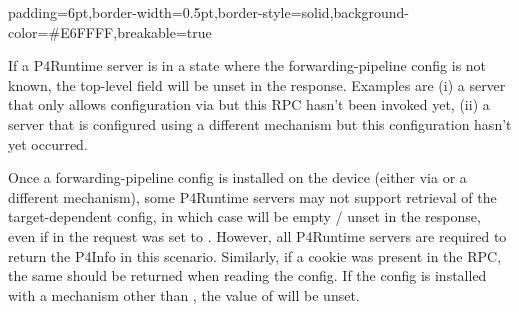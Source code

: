 \documentclass[11pt]{article}
\begin{document}
{%
\begin{mdbmargintb}{6pt}{6pt}%
\begin{mdblock}{padding=6pt,border-width=0.5pt,border-style=solid,background-color=\#E6FFFF,breakable=true}%
\begin{mdpre}%
\end{mdpre}%
\end{mdblock}%
\end{mdbmargintb}%

\noindent{}If a P4Runtime server is in a state where the forwarding-pipeline config is not
known, the top-level  field will be unset in the response. Examples are
(i) a server that only allows configuration via 
but this RPC hasn't been invoked yet, (ii) a server that is configured using a
different mechanism but this configuration hasn't yet occurred.%

Once a forwarding-pipeline config is installed on the device (either via
 or a different mechanism), some P4Runtime servers
may not support retrieval of the target-dependent config, in which case
 will be empty / unset in the response, even if
 in the request was set to . However, all P4Runtime servers
are required to return the P4Info in this scenario. Similarly, if a cookie was
present in the  RPC, the same should be returned
when reading the config. If the config is installed with a mechanism other than
, the value of  will be unset.%

}
\end{document}
